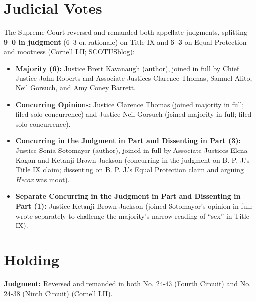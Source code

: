 \documentclass[12pt]{article}
\begin{document}
\section{Judicial Votes}

The Supreme Court reversed and remanded both appellate judgments, splitting \textbf{9--0 in judgment} (6--3 on rationale) on Title IX and \textbf{6--3} on Equal Protection and mootness (\href{https://www.law.cornell.edu/supremecourt/text/24-43}{Cornell LII}; \href{https://www.scotusblog.com/2026/06/court-rules-that-states-can-exclude-transgender-athletes-from-girls-and-womens-sports-teams/}{SCOTUSblog}):
\begin{itemize}
\item \textbf{Majority (6):} Justice Brett Kavanaugh (author), joined in full by Chief Justice John Roberts and Associate Justices Clarence Thomas, Samuel Alito, Neil Gorsuch, and Amy Coney Barrett.
\item \textbf{Concurring Opinions:} Justice Clarence Thomas (joined majority in full; filed solo concurrence) and Justice Neil Gorsuch (joined majority in full; filed solo concurrence).
\item \textbf{Concurring in the Judgment in Part and Dissenting in Part (3):} Justice Sonia Sotomayor (author), joined in full by Associate Justices Elena Kagan and Ketanji Brown Jackson (concurring in the judgment on B. P. J.'s Title IX claim; dissenting on B. P. J.'s Equal Protection claim and arguing \textit{Hecox} was moot).
\item \textbf{Separate Concurring in the Judgment in Part and Dissenting in Part (1):} Justice Ketanji Brown Jackson (joined Sotomayor's opinion in full; wrote separately to challenge the majority's narrow reading of ``sex'' in Title IX).
\end{itemize}

\section{Holding}

\textbf{Judgment:} Reversed and remanded in both No. 24-43 (Fourth Circuit) and No. 24-38 (Ninth Circuit) (\href{https://www.law.cornell.edu/supremecourt/text/24-43}{Cornell LII}).
\end{document}
